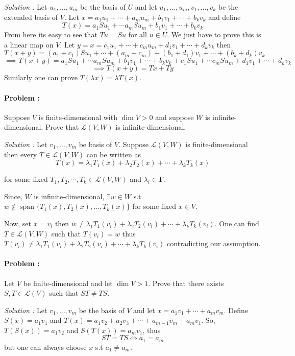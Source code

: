\vspace{4mm}
\textit{Solution :} Let $u_1,\ldots,u_m$ be the basis of $U$ and let $u_1,\ldots,u_m,v_1,\ldots,v_k$ be the extended basis of $V$.
Let $x=a_1u_1 + \cdots + a_m u_m + b_1 v_1 + \cdots + b_k v_k$ and define 
\[ T(x)=a_1 Su_1 + \cdots a_m Su_m + b_1 v_1 + \cdots + b_k v_k \]
From here its easy to see that $Tu=Su$ for all $u \in U$. We just have to prove this is a linear map on $V$. Let 
$y=x=c_1u_1 + \cdots + c_m u_m + d_1 v_1 + \cdots + d_k v_k$ then
\[ T(x+y)=(a_1+c_1)Su_1 + \cdots + (a_m+c_m) + (b_1+d_1)v_1 + \cdots + (b_k + d_k)v_k \] 
\[ \implies T(x+y) = a_1 Su_1 + \cdots a_m Su_m + b_1 v_1 + \cdots + b_k v_k + c_1 Su_1 + \cdots c_m Su_m + d_1 v_1 + \cdots + d_k v_k \]
\[ \implies T(x+y)= Tx + Ty \]
Similarly one can prove $T(\lambda x) = \lambda T(x)$.

\paragraph{Problem :} Suppose $V$ is finite-dimensional with $\dim V > 0$ and suppose $W$ is infinite-dimensional. Prove that $\mathcal{L}(V,W)$
is infinite-dimensional.

\vspace{4mm}
\textit{Solution :} Let $v_1,\ldots, v_m$ be basis of $V$. Suppose $\mathcal{L}(V,W)$ is finite-dimensional then every $T \in \mathcal{L}(V,W)$
can be written as 
\[ T(x) = \lambda_1 T_1(x) + \lambda_2 T_2(x) + \cdots + \lambda_k T_k(x) \]

for some fixed $T_1,T_2,\cdots,T_k \in \mathcal{L}(V,W)$ and $\lambda_i \in \mathbf{F}$.

Since, $W$ is infinite-dimensional, $\exists w \in W$ s.t 
$w \not \in  \operatorname{span}\{T_1(x), T_2(x), \ldots,T_k(x)\}$ for some fixed $x \in V$.

Now, set $x=v_i$ then $w \neq \lambda_1 T_1(v_i) + \lambda_2 T_2(v_i) + \cdots + \lambda_k T_k(v_i)$. One can find $T \in \mathcal{L}(V,W)$
such that $T(v_i)=w$ thus $T(v_i) \neq \lambda_1 T_1(v_i) + \lambda_2 T_2(v_i) + \cdots + \lambda_k T_k(v_i)$ contradicting our assumption.

\paragraph{Problem :} Let $V$ be finite-dimensional and let $\dim V > 1$. Prove that there exists $S,T \in \mathcal{L}(V)$ such that $ST \neq TS$.

\vspace{4mm}
\textit{Solution :}
Let $v_1,\ldots,v_m$ be the basis of $V$ and let $x=a_1v_1 + \cdots + a_m v_m$. Define $S(x)=a_1v_1$ and 
$T(x)=a_1v_2+a_2v_3 + \cdots + a_{m-1}v_m + a_{m}v_1$. So, $T(S(x))=a_1v_2$ and $S(T(x))=a_m v_1$, thus
\[ ST = TS \iff a_1 = a_m \]
but one can always choose $x$ s.t $a_1 \neq a_m$.

